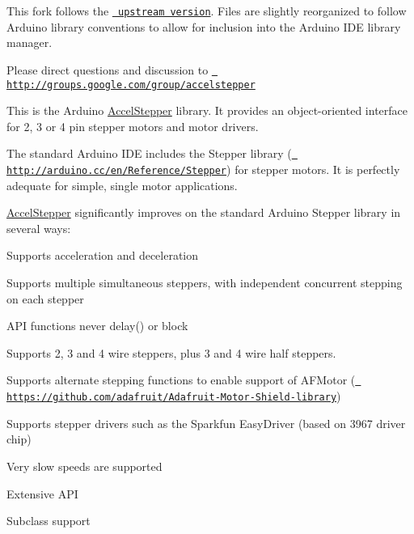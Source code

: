 This fork follows the \href{http://www.airspayce.com/mikem/arduino/AccelStepper/}{\texttt{ upstream version}}. Files are slightly reorganized to follow Arduino library conventions to allow for inclusion into the Arduino IDE library manager.

Please direct questions and discussion to \href{http://groups.google.com/group/accelstepper}{\texttt{ http\+://groups.\+google.\+com/group/accelstepper}}



This is the Arduino \mbox{\hyperlink{class_accel_stepper}{Accel\+Stepper}} library. It provides an object-\/oriented interface for 2, 3 or 4 pin stepper motors and motor drivers.

The standard Arduino IDE includes the Stepper library (\href{http://arduino.cc/en/Reference/Stepper}{\texttt{ http\+://arduino.\+cc/en/\+Reference/\+Stepper}}) for stepper motors. It is perfectly adequate for simple, single motor applications.

\mbox{\hyperlink{class_accel_stepper}{Accel\+Stepper}} significantly improves on the standard Arduino Stepper library in several ways\+:


\begin{DoxyItemize}
\item Supports acceleration and deceleration
\item Supports multiple simultaneous steppers, with independent concurrent stepping on each stepper
\item API functions never delay() or block
\item Supports 2, 3 and 4 wire steppers, plus 3 and 4 wire half steppers.
\item Supports alternate stepping functions to enable support of AFMotor (\href{https://github.com/adafruit/Adafruit-Motor-Shield-library}{\texttt{ https\+://github.\+com/adafruit/\+Adafruit-\/\+Motor-\/\+Shield-\/library}})
\item Supports stepper drivers such as the Sparkfun Easy\+Driver (based on 3967 driver chip)
\item Very slow speeds are supported
\item Extensive API
\item Subclass support 
\end{DoxyItemize}